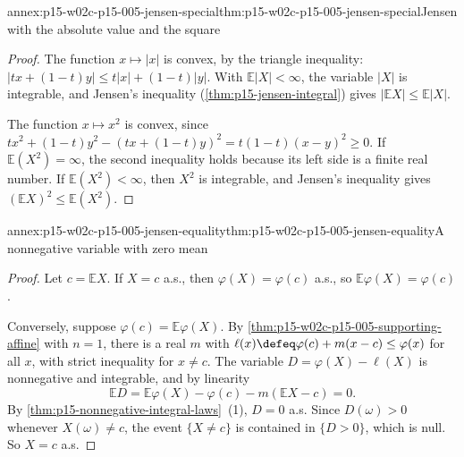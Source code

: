 \begin{annexitem}{annex:p15-w02c-p15-005-jensen-special}{thm:p15-w02c-p15-005-jensen-special}{Jensen with the absolute value and the square}
\begin{proof}
The function \(x\mapsto|x|\) is convex, by the triangle inequality:
\(|tx+(1-t)y|\leq t|x|+(1-t)|y|\). With \(\mathbb E|X|<\infty\), the
variable \(|X|\) is integrable, and Jensen's inequality
(\cref{thm:p15-jensen-integral}) gives
\(|\mathbb EX|\leq\mathbb E|X|\).

The function \(x\mapsto x^2\) is convex, since
\(tx^2+(1-t)y^2-(tx+(1-t)y)^2=t(1-t)(x-y)^2\geq0\). If
\(\mathbb E(X^2)=\infty\), the second inequality holds because its
left side is a finite real number. If \(\mathbb E(X^2)<\infty\), then
\(X^2\) is integrable, and Jensen's inequality gives
\((\mathbb EX)^2\leq\mathbb E(X^2)\).
\end{proof}
\end{annexitem}

\begin{annexitem}{annex:p15-w02c-p15-005-jensen-equality}{thm:p15-w02c-p15-005-jensen-equality}{A nonnegative variable with zero mean}
\begin{proof}
Let \(c=\mathbb EX\). If \(X=c\) a.s., then \(\varphi(X)=\varphi(c)\)
a.s., so \(\mathbb E\varphi(X)=\varphi(c)\).

Conversely, suppose \(\varphi(c)=\mathbb E\varphi(X)\). By
\cref{thm:p15-w02c-p15-005-supporting-affine} with \(n=1\), there is a
real \(m\) with \(\ell(x)\defeq\varphi(c)+m(x-c)\leq\varphi(x)\) for
all \(x\), with strict inequality for \(x\neq c\). The variable
\(D=\varphi(X)-\ell(X)\) is nonnegative and integrable, and by linearity
\[
 \mathbb ED=\mathbb E\varphi(X)-\varphi(c)-m(\mathbb EX-c)=0 .
\]
By \cref{thm:p15-nonnegative-integral-laws}~(1), \(D=0\) a.s. Since
\(D(\omega)>0\) whenever \(X(\omega)\neq c\), the event
\(\{X\neq c\}\) is contained in \(\{D>0\}\), which is null. So
\(X=c\) a.s.
\end{proof}
\end{annexitem}

